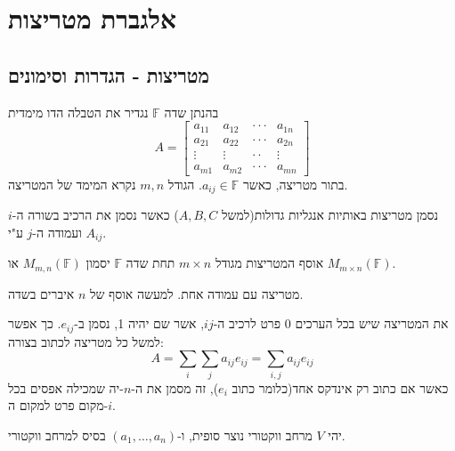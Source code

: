 \documentclass{tstextbook}
\begin{document}
\chapter{אלגברת מטריצות}

\section{מטריצות - הגדרות וסימונים}

\begin{definition}
בהנתן שדה \(\mathbb{F}\) נגדיר את הטבלה הדו מימדית 
$$A=\begin{bmatrix}a_{11}&a_{12}&\cdot\cdot\cdot&a_{1n}\\ a_{21}&a_{22}&\cdot\cdot\cdot&a_{2n}\\ \vdots&\vdots&\cdot\cdot&\vdots\\ a_{m1}&a_{m2}&\cdot\cdot\cdot&a_{m n}\end{bmatrix}$$
בתור מטריצה, כאשר \(a_{ij}\in \mathbb{F}\). הגודל \(m,n\) נקרא המימד של המטריצה.

\end{definition}
\begin{symbolize}
נסמן מטריצות באותיות אנגליות גדולות(למשל \(A,B,C\)) כאשר נסמן את הרכיב בשורה ה-\(i\) ועמודה ה-\(j\) ע"י \(A_{ij}\). 

\end{symbolize}
\begin{symbolize}
אוסף המטריצות מגודל \(m\times n\) תחת שדה \(\mathbb{F}\) יסמון \(M_{m,n}\left( \mathbb{F} \right)\) או \(M_{m\times n}\left( \mathbb{F}  \right)\).

\end{symbolize}
\begin{definition}[n-יה]
מטריצה עם עמודה אחת. למעשה אוסף של \(n\) איברים בשדה.

\end{definition}
\begin{symbolize}
את המטריצה שיש בכל הערכים \(0\) פרט לרכיב ה-\(ij\), אשר שם יהיה 1, נסמן ב-\(e_{ij}\). כך אפשר למשל כל מטריצה לכתוב בצורה:
$$A=\sum_{i}\sum_{j}a_{ij}e_{ij}=\sum_{i,j}a_{ij}e_{ij}$$
כאשר אם כתוב רק אינדקס אחד(כלומר כתוב \(e_{i}\)), זה מסמן את ה-\(n\)-יה שמכילה אפסים בכל מקום פרט למקום ה-\(i\).

\end{symbolize}
\begin{definition}
יהי \(V\) מרחב ווקטורי נוצר סופית, ו-\(\left( a_{1},\dots,a_{n} \right)\) בסיס למרחב ווקטורי.

\end{definition}
\end{document}
